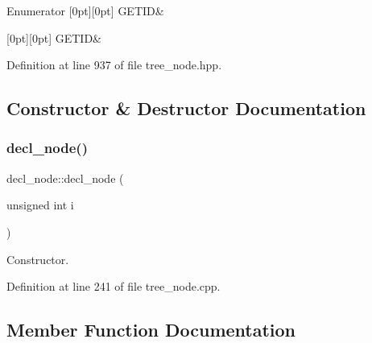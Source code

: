 \begin{DoxyEnumFields}{Enumerator}
[0pt][0pt]{}\mbox{\label{structdecl__node_a7d7ab7893f21527db576f4ef976365a3a5a9eacd105de8a0d66c9dd9a4145ee52}} 
G\+E\+T\+ID&\\
\hline

[0pt][0pt]{}\mbox{\label{structdecl__node_a7d7ab7893f21527db576f4ef976365a3a5a9eacd105de8a0d66c9dd9a4145ee52}} 
G\+E\+T\+ID&\\
\hline

\end{DoxyEnumFields}


Definition at line 937 of file tree\+\_\+node.\+hpp.



\subsection{Constructor \& Destructor Documentation}
\mbox{\label{structdecl__node_a14d187de2ad8c1774eaaaae13f0441da}} 
\subsubsection{\texorpdfstring{decl\+\_\+node()}{decl\_node()}}
{\footnotesize\ttfamily decl\+\_\+node\+::decl\+\_\+node (\begin{DoxyParamCaption}\item[{unsigned int}]{i }\end{DoxyParamCaption})\hspace{0.3cm}{\ttfamily [explicit]}}



Constructor. 



Definition at line 241 of file tree\+\_\+node.\+cpp.



\subsection{Member Function Documentation}
\mbox{\label{structdecl__node_a9e63331f0c35d9af9d1997afafe9152a}} 
